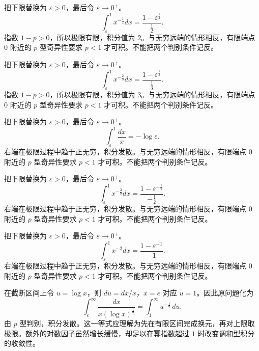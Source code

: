 \documentclass[12pt,fontset=fandol]{ctexart}
\begin{document}
\begin{solve}\label{ans:c19q9}
把下限替换为 $\varepsilon>0$，最后令 $\varepsilon\to0^+$。
\[
\int_\varepsilon^1x^{-\frac{1}{2}}dx=\frac{1-\varepsilon^{\frac{1}{2}}}{\frac{1}{2}}.
\]
指数 $1-p>0$，所以极限有限，积分值为 $2$。与无穷远端的情形相反，有限端点 $0$ 附近的 $p$ 型奇异性要求 $p<1$ 才可积。不能把两个判别条件记反。
\end{solve}

\begin{solve}\label{ans:c19q10}
把下限替换为 $\varepsilon>0$，最后令 $\varepsilon\to0^+$。
\[
\int_\varepsilon^1x^{-\frac{2}{3}}dx=\frac{1-\varepsilon^{\frac{1}{3}}}{\frac{1}{3}}.
\]
指数 $1-p>0$，所以极限有限，积分值为 $3$。与无穷远端的情形相反，有限端点 $0$ 附近的 $p$ 型奇异性要求 $p<1$ 才可积。不能把两个判别条件记反。
\end{solve}

\begin{solve}\label{ans:c19q11}
把下限替换为 $\varepsilon>0$，最后令 $\varepsilon\to0^+$。
\[
\int_\varepsilon^1\frac{dx}{x}=-\log\varepsilon.
\]
右端在极限过程中趋于正无穷，积分发散。与无穷远端的情形相反，有限端点 $0$ 附近的 $p$ 型奇异性要求 $p<1$ 才可积。不能把两个判别条件记反。
\end{solve}

\begin{solve}\label{ans:c19q12}
把下限替换为 $\varepsilon>0$，最后令 $\varepsilon\to0^+$。
\[
\int_\varepsilon^1x^{-\frac{3}{2}}dx=\frac{1-\varepsilon^{-\frac{1}{2}}}{-\frac{1}{2}}.
\]
右端在极限过程中趋于正无穷，积分发散。与无穷远端的情形相反，有限端点 $0$ 附近的 $p$ 型奇异性要求 $p<1$ 才可积。不能把两个判别条件记反。
\end{solve}

\begin{solve}\label{ans:c19q13}
把下限替换为 $\varepsilon>0$，最后令 $\varepsilon\to0^+$。
\[
\int_\varepsilon^1x^{-2}dx=\frac{1-\varepsilon^{-1}}{-1}.
\]
右端在极限过程中趋于正无穷，积分发散。与无穷远端的情形相反，有限端点 $0$ 附近的 $p$ 型奇异性要求 $p<1$ 才可积。不能把两个判别条件记反。
\end{solve}

\begin{solve}\label{ans:c19q14}
在截断区间上令 $u=\log x$，则 $du=dx/x$，$x=e$ 对应 $u=1$。因此原问题化为
\[
\int_e^\infty\frac{dx}{x(\log x)^{\frac{1}{2}}}=\int_1^\infty u^{-\frac{1}{2}}\,du.
\]
由 $p$ 型判别，积分发散。这一等式应理解为先在有限区间完成换元，再对上限取极限。额外的对数因子虽然增长缓慢，却足以在幂指数超过 $1$ 时改变调和型积分的收敛性。
\end{solve}
\end{document}
